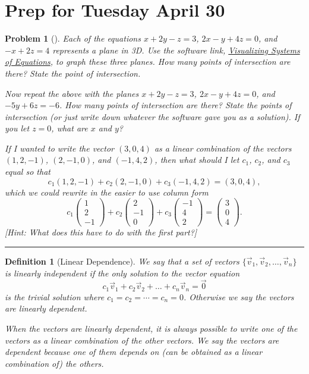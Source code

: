 \documentclass[letterpaper,oneside]{book}%
\theoremstyle{plain}
\theoremstyle{box}
\newtheorem{definition}[theorem]{Definition}
\theoremstyle{problem}
\newtheorem{problemnum}{Problem}[chapter]
\newenvironment{problem}[1][]{\begin{problemnum}[#1]}{\end{problemnum}\nopagebreak\hrule\bigskip}
\newcommand{\pvec}[1]{\begin{pmatrix} #1 \end{pmatrix}}
\begin{document}
\section{Prep for Tuesday April 30}

\begin{problem}
 Each of the equations $x+2y-z=3$, $2x-y+4z=0$, and $-x+2z=4$ represents a plane in 3D.  Use the software link, \href{http://bmw.byuimath.com/dokuwiki/doku.php?id=visualizing\_systems\_of\_equations}{Visualizing Systems of Equations},  to graph these three planes. How many points of intersection are there? State the point of intersection.  

 Now repeat the above with the planes $x+2y-z=3$, $2x-y+4z=0$, and $-5y+6z=-6$.  How many points of intersection are there?  State the points of intersection (or just write down whatever the software gave you as a solution). If you let $z=0$, what are $x$ and $y$?  

 If I wanted to write the vector $(3,0,4)$ as a linear combination of the vectors $(1,2,-1)$, $(2,-1,0)$, and $(-1,4,2)$, then what should I let $c_1$, $c_2$, and $c_3$ equal so that 
$$ c_1(1,2,-1)+c_2(2,-1,0)+c_3(-1,4,2)=(3,0,4),$$ 
which we could rewrite in the easier to use column form
$$ c_1\pvec{1\\2\\-1}+c_2\pvec{2\\-1\\0}+c_3\pvec{-1\\4\\2}=\pvec{3\\0\\4}.$$
[Hint: What does this have to do with the first part?] 

\end{problem}



\begin{definition}[Linear Dependence]
We say that a set of vectors $\{\vec v_1,\vec v_2, \ldots, \vec v_n\}$ is linearly independent if the only solution to the vector equation $$c_1\vec v_{1}+c_2\vec v_{2}+\ldots+c_n\vec v_{n}=\vec 0$$ is the trivial solution where $c_1=c_2=\cdots=c_n=0$. 
Otherwise we say the vectors are linearly dependent.

When the vectors are linearly dependent, it is always possible to write one of the vectors as a linear combination of the other vectors. 
We say the vectors are dependent because one of them depends on (can be obtained as a linear combination of) the others.
\end{definition}
\end{document}
